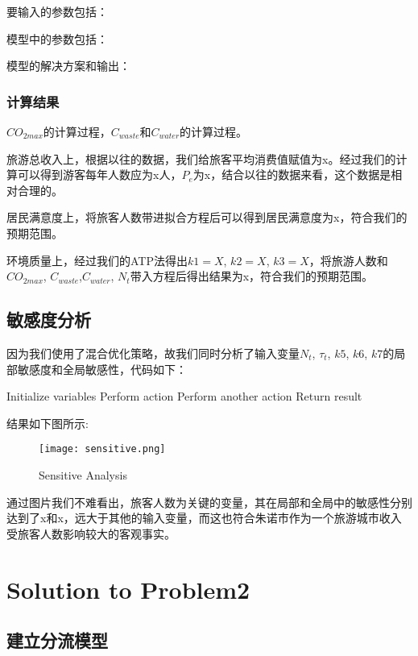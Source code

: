 \documentclass[12pt]{article}  %
\begin{document}
要输入的参数包括：

模型中的参数包括：

模型的解决方案和输出：
\subsubsection{计算结果}
$CO_{2max}$的计算过程，$C_{waste}$和$C_{water}$的计算过程。

旅游总收入上，根据以往的数据，我们给旅客平均消费值赋值为x。经过我们的计算可以得到游客每年人数应为x人，$P_e$为x，结合以往的数据来看，这个数据是相对合理的。

居民满意度上，将旅客人数带进拟合方程后可以得到居民满意度为x，符合我们的预期范围。

环境质量上，经过我们的ATP法得出$k1 = X$, $k2 = X$, $k3 = X$，将旅游人数和$CO_{2max}$, $C_{waste}$,$C_{water}$, $N_t$带入方程后得出结果为x，符合我们的预期范围。
\subsection{敏感度分析}
因为我们使用了混合优化策略，故我们同时分析了输入变量$N_t$, $\tau _t$, $k5$, $k6$, $k7$的局部敏感度和全局敏感性，代码如下：
\begin{algorithm}
	\caption{$Sensitive Analysis$}
	\begin{algorithmic}[1]
		\STATE Initialize variables
				\STATE Perform action
			\ELSE
				\STATE Perform another action
			\ENDIF
		\ENDFOR
		\STATE Return result
	\end{algorithmic}
\end{algorithm}

结果如下图所示:
\begin{figure}[H]
	\centering
	\texttt{[image: sensitive.png]}
	\caption{Sensitive Analysis}\label{fig:sensitive}
\end{figure}

通过图片我们不难看出，旅客人数为关键的变量，其在局部和全局中的敏感性分别达到了x和x，远大于其他的输入变量，而这也符合朱诺市作为一个旅游城市收入受旅客人数影响较大的客观事实。
\section{Solution to Problem2}
\subsection{建立分流模型}
\end{document}
